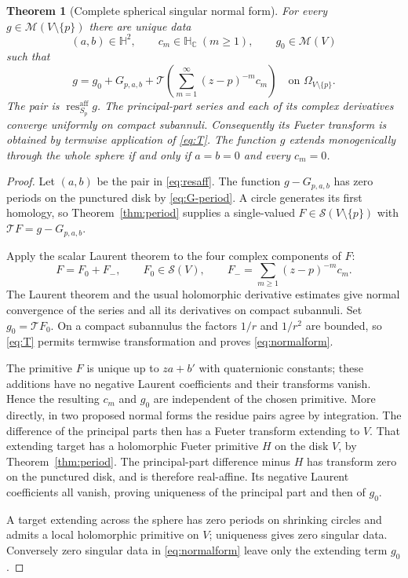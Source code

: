 \documentclass[11pt,a4paper]{article}
\numberwithin{equation}{section}
\newtheorem{theorem}{Theorem}[section]
\theoremstyle{definition}
\theoremstyle{remark}
\newcommand{\C}{\mathbb C}
\newcommand{\HH}{\mathbb H}
\newcommand{\HC}{\mathbb H_{\C}}
\newcommand{\cS}{\mathscr S}
\newcommand{\cM}{\mathscr M}
\newcommand{\T}{\mathcal T}
\newcommand{\resaff}{\operatorname{res}^{\mathrm{aff}}}
\begin{document}
\begin{theorem}[Complete spherical singular normal form]
\label{thm:normal}
For every $g\in\cM(V\setminus\{p\})$ there are unique data
\[
 (a,b)\in\HH^2,\qquad c_m\in\HC\ (m\ge1),\qquad g_0\in\cM(V)
\]
such that
\begin{equation}
 g=g_0+G_{p,a,b}
       +\T\left(\sum_{m=1}^{\infty}(z-p)^{-m}c_m\right)
 \quad\text{on }\Omega_{V\setminus\{p\}}.
 \label{eq:normalform}
\end{equation}
The pair is $\resaff_{S_p}g$. The principal-part series and each of its
complex derivatives converge uniformly on compact subannuli. Consequently
its Fueter transform is obtained by termwise application of \eqref{eq:T}.
The function $g$ extends monogenically through the whole sphere if and only
if $a=b=0$ and every $c_m=0$.
\end{theorem}
\begin{proof}
Let $(a,b)$ be the pair in \eqref{eq:resaff}. The function
$g-G_{p,a,b}$ has zero periods on the punctured disk by
\eqref{eq:G-period}. A circle generates its first homology, so
Theorem~\ref{thm:period} supplies a single-valued
$F\in\cS(V\setminus\{p\})$ with
$\T F=g-G_{p,a,b}$.

Apply the scalar Laurent theorem to the four complex components of $F$:
\[
 F=F_0+F_-,\qquad F_0\in\cS(V),\qquad
 F_- =\sum_{m\ge1}(z-p)^{-m}c_m.
\]
The Laurent theorem and the usual holomorphic derivative estimates give
normal convergence of the series and all its derivatives on compact
subannuli. Set $g_0=\T F_0$. On a compact subannulus the factors $1/r$ and
$1/r^2$ are bounded, so \eqref{eq:T} permits termwise transformation and
proves \eqref{eq:normalform}.

The primitive $F$ is unique up to $za+b'$ with quaternionic constants;
these additions have no negative Laurent coefficients and their transforms
vanish. Hence the resulting $c_m$ and $g_0$ are independent of the chosen
primitive. More directly, in two proposed normal forms the residue pairs
agree by integration. The difference of the principal parts then has a
Fueter transform extending to $V$. That extending target has a holomorphic
Fueter primitive $H$ on the disk $V$, by Theorem~\ref{thm:period}. The
principal-part difference minus $H$ has transform zero on the punctured
disk, and is therefore real-affine. Its negative Laurent coefficients all
vanish, proving uniqueness of the principal part and then of $g_0$.

A target extending across the sphere has zero periods on shrinking circles
and admits a local holomorphic primitive on $V$; uniqueness gives zero
singular data. Conversely zero singular data in \eqref{eq:normalform} leave
only the extending term $g_0$.
\end{proof}
\end{document}

